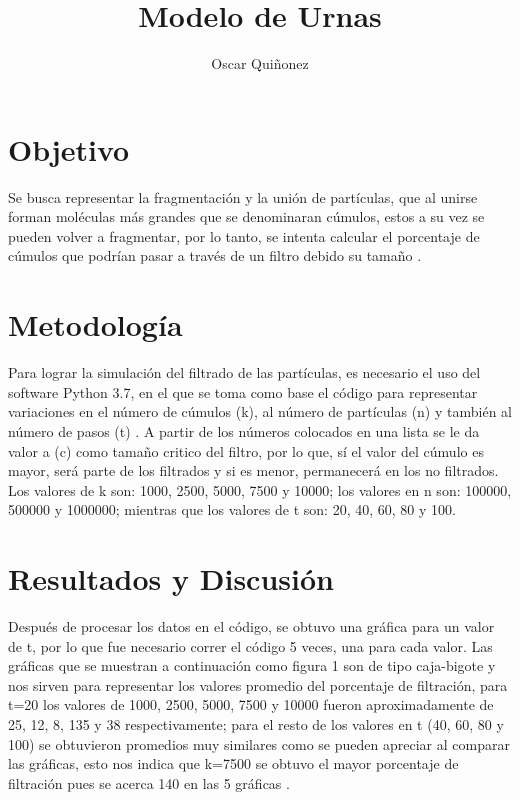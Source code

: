 \documentclass{article}
\title {Modelo de Urnas}
\author{Oscar Qui\~nonez}
\begin{document}
\maketitle
 
\section{Objetivo}\label{met}

Se busca representar la fragmentaci\'on y la uni\'on de part\'iculas, que al unirse forman mol\'eculas m\'as grandes que se denominaran c\'umulos, estos a su vez se pueden volver a fragmentar, por lo tanto, se intenta calcular el porcentaje de c\'umulos que podr\'ian pasar a trav\'es de un filtro debido su tama\~no \cite{satuelisa}.

\section{Metodolog\'ia}\label{met}

Para lograr la simulaci\'on del filtrado de las part\'iculas, es necesario el uso del software Python 3.7, en el que se toma como base el c\'odigo \cite{doctora} para representar variaciones en el n\'umero de c\'umulos (k), al n\'umero de part\'iculas (n) y tambi\'en al n\'umero de pasos (t) \cite{discord}. A partir de los n\'umeros colocados en una lista se le da valor a  (c) como tama\~no critico del filtro, por lo que, s\'i el valor del c\'umulo es mayor, ser\'a parte de los filtrados y si es menor, permanecer\'a en los no filtrados.
Los valores de k son: 1000, 2500, 5000, 7500 y 10000; los valores en n son: 100000, 500000 y 1000000; mientras que los valores de t son: 20, 40, 60, 80 y 100.

\section{Resultados y Discusi\'on}\label{res}

Despu\'es de procesar los datos en el c\'odigo, se obtuvo una gr\'afica para un valor de t, por lo que fue necesario correr el c\'odigo 5 veces, una para cada valor. Las gr\'aficas que se muestran a continuaci\'on como figura 1 son de tipo caja-bigote y nos sirven para representar los valores promedio del porcentaje de filtraci\'on, para t=20 los valores de 1000, 2500, 5000, 7500 y 10000 fueron aproximadamente de 25, 12, 8, 135 y 38 respectivamente; para el resto de los valores en t (40, 60, 80 y 100) se obtuvieron promedios muy similares como se pueden apreciar al comparar las gr\'aficas, esto nos indica que k=7500 se obtuvo el mayor porcentaje de filtraci\'on pues se acerca 140 en las 5 gr\'aficas \cite{yo}.
\end{document}
